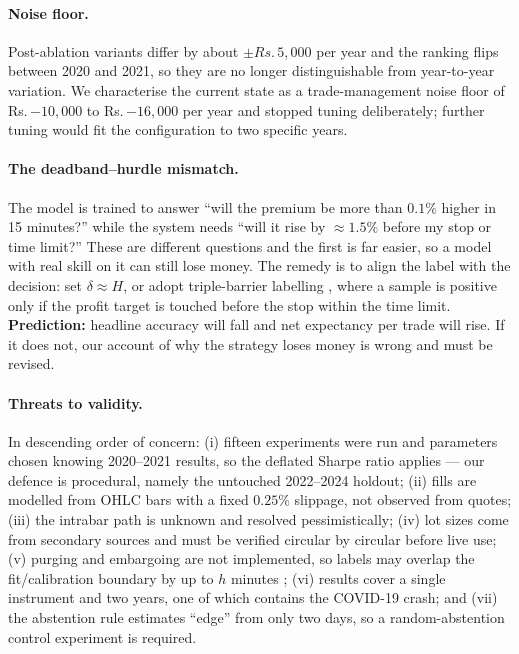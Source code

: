 \documentclass[10pt,a4paper]{article}
\newcommand{\rs}{Rs.\,}
\begin{document}
\paragraph{Noise floor.} Post-ablation variants differ by about
$\pm\rs5{,}000$ per year and the ranking flips between 2020 and 2021, so they
are no longer distinguishable from year-to-year variation. We characterise the
current state as a trade-management noise floor of \rs$-10{,}000$ to
\rs$-16{,}000$ per year and stopped tuning deliberately; further tuning would
fit the configuration to two specific years.

\paragraph{The deadband--hurdle mismatch.} The model is trained to answer
``will the premium be more than $0.1\%$ higher in 15 minutes?'' while the
system needs ``will it rise by $\approx1.5\%$ before my stop or time limit?''
These are different questions and the first is far easier, so a model with real
skill on it can still lose money. The remedy is to align the label with the
decision: set $\delta \approx H$, or adopt triple-barrier labelling
\cite{lopezdeprado}, where a sample is positive only if the profit target is
touched before the stop within the time limit. \textbf{Prediction:} headline
accuracy will fall and net expectancy per trade will rise. If it does not, our
account of why the strategy loses money is wrong and must be revised.

\paragraph{Threats to validity.} In descending order of concern:
(i) fifteen experiments were run and parameters chosen knowing 2020--2021
results, so the deflated Sharpe ratio \cite{deflatedsharpe} applies --- our
defence is procedural, namely the untouched 2022--2024 holdout;
(ii) fills are modelled from OHLC bars with a fixed $0.25\%$ slippage, not
observed from quotes;
(iii) the intrabar path is unknown and resolved pessimistically;
(iv) lot sizes come from secondary sources and must be verified circular by
circular before live use;
(v) purging and embargoing are not implemented, so labels may overlap the
fit/calibration boundary by up to $h$ minutes \cite{lopezdeprado};
(vi) results cover a single instrument and two years, one of which contains the
COVID-19 crash; and
(vii) the abstention rule estimates ``edge'' from only two days, so a
random-abstention control experiment is required.
\end{document}
